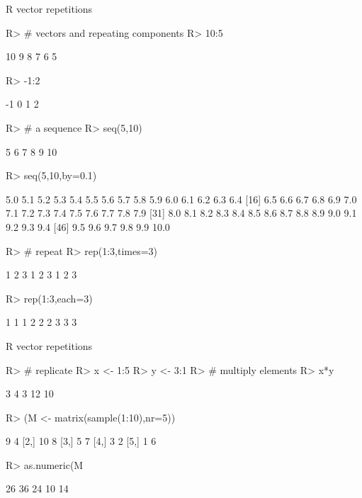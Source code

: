 \documentclass[10pt]{beamer}
\let\proglang=\textsf
\begin{document}
%
\begin{frame}[fragile]{\proglang{R} vector repetitions}
\begin{Schunk}
\begin{Sinput}
R> # vectors and repeating components
R> 10:5
\end{Sinput}
\begin{Soutput}
[1] 10  9  8  7  6  5
\end{Soutput}
\begin{Sinput}
R> -1:2
\end{Sinput}
\begin{Soutput}
[1] -1  0  1  2
\end{Soutput}
\begin{Sinput}
R> # a sequence
R> seq(5,10)
\end{Sinput}
\begin{Soutput}
[1]  5  6  7  8  9 10
\end{Soutput}
\begin{Sinput}
R> seq(5,10,by=0.1)
\end{Sinput}
\begin{Soutput}
 [1]  5.0  5.1  5.2  5.3  5.4  5.5  5.6  5.7  5.8  5.9  6.0  6.1  6.2  6.3  6.4
[16]  6.5  6.6  6.7  6.8  6.9  7.0  7.1  7.2  7.3  7.4  7.5  7.6  7.7  7.8  7.9
[31]  8.0  8.1  8.2  8.3  8.4  8.5  8.6  8.7  8.8  8.9  9.0  9.1  9.2  9.3  9.4
[46]  9.5  9.6  9.7  9.8  9.9 10.0
\end{Soutput}
\begin{Sinput}
R> # repeat
R> rep(1:3,times=3)
\end{Sinput}
\begin{Soutput}
[1] 1 2 3 1 2 3 1 2 3
\end{Soutput}
\begin{Sinput}
R> rep(1:3,each=3)
\end{Sinput}
\begin{Soutput}
[1] 1 1 1 2 2 2 3 3 3
\end{Soutput}
\end{Schunk}
\end{frame}
%
\begin{frame}[fragile]{\proglang{R} vector repetitions}
\begin{Schunk}
\begin{Sinput}
R> # replicate
R> x <- 1:5
R> y <- 3:1
R> # multiply elements
R> x*y
\end{Sinput}
\begin{Soutput}
[1]  3  4  3 12 10
\end{Soutput}
\begin{Sinput}
R> (M <- matrix(sample(1:10),nr=5))
\end{Sinput}
\begin{Soutput}
     [,1] [,2]
[1,]    9    4
[2,]   10    8
[3,]    5    7
[4,]    3    2
[5,]    1    6
\end{Soutput}
\begin{Sinput}
R> as.numeric(M%*%c(2,2))
\end{Sinput}
\begin{Soutput}
[1] 26 36 24 10 14
\end{Soutput}
\end{Schunk}
\end{frame}
\end{document}
